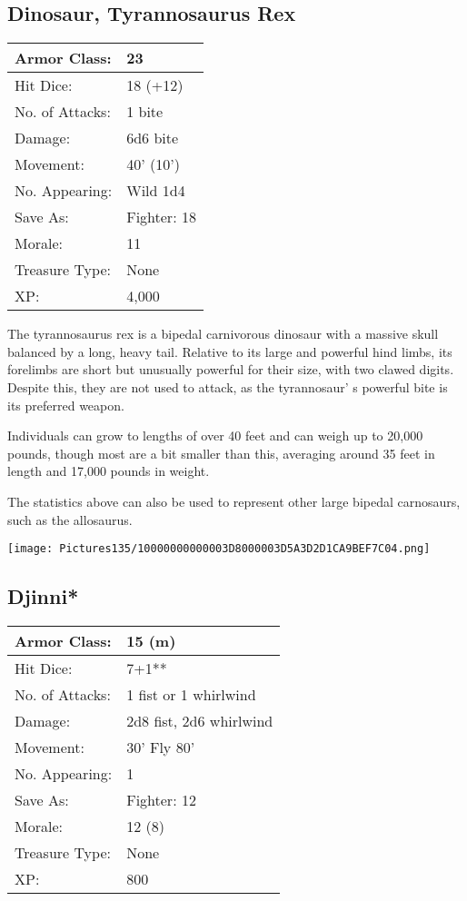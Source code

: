 \documentclass[a4paper,twoside,openany,10pt]{book}
\begin{document}
\begin{multicols}{2}
\subsection*{Dinosaur, Tyrannosaurus Rex}\label{dinosaur-tyrannosaurus-rex}


\begin{tabularx}{0.48\textwidth}{@{}lX@{}}
Armor Class: & 23 \\\hline
Hit Dice: & 18 (+12) \\\hline
No. of Attacks: & 1 bite \\\hline
Damage: & 6d6 bite \\\hline
Movement: & 40' (10') \\\hline
No. Appearing: & Wild 1d4 \\\hline
Save As: & Fighter: 18 \\\hline
Morale: & 11 \\\hline
Treasure Type: & None \\\hline
XP: & 4,000 \\\hline
\end{tabularx}\medskip

The tyrannosaurus rex is a bipedal carnivorous dinosaur with a massive skull balanced by a long, heavy tail. Relative to its large and powerful hind limbs, its forelimbs are short but unusually powerful for their size, with two clawed digits. Despite this, they are not used to attack, as the tyrannosaur' s powerful bite is its preferred weapon.

Individuals can grow to lengths of over 40 feet and can weigh up to 20,000 pounds, though most are a bit smaller than this, averaging around 35 feet in length and 17,000 pounds in weight.

The statistics above can also be used to represent other large bipedal carnosaurs, such as the allosaurus.

\begin{center}
	\texttt{[image: Pictures135/10000000000003D8000003D5A3D2D1CA9BEF7C04.png]}
\end{center}

\subsection*{Djinni*}\label{djinni}


\begin{tabularx}{0.48\textwidth}{@{}lX@{}}
Armor Class: & 15 (m) \\\hline
Hit Dice: & 7+1** \\\hline
No. of Attacks: & 1 fist or 1 whirlwind \\\hline
Damage: & 2d8 fist, 2d6 whirlwind \\\hline
Movement: & 30' Fly 80' \\\hline
No. Appearing: & 1 \\\hline
Save As: & Fighter: 12 \\\hline
Morale: & 12 (8) \\\hline
Treasure Type: & None \\\hline
XP: & 800 \\\hline
\end{tabularx}\medskip


\end{multicols}
\end{document}
